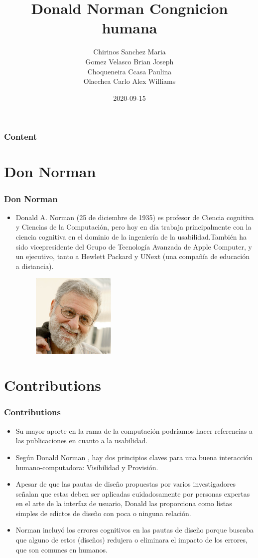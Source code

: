 \documentclass[11pt]{beamer}
\title[Donald Norman - Congnicion humana]{\bf\Huge Donald Norman    Congnicion humana }
\author[rescobedoq]
{
    Chirinos Sanchez Maria\inst{1}\\
	Gomez Velasco Brian Joseph \inst{2}\\
	Choqueneira Ccasa Paulina \inst{3}\\
	Olaechea Carlo Alex Williams\inst{4}
}
\institute[UNSA]
{
\inst{1}%
System Engineering School\\
}
\date[2020-09-15]{\scriptsize{2020-09-15}}
\begin{document}
\begin{frame}
\titlepage
\end{frame}

\begin{frame}
\frametitle{Content}
\tableofcontents
\end{frame}

\section{Don Norman}
\begin{frame}
\frametitle{Don Norman}
\begin{itemize}
 \item Donald A. Norman (25 de diciembre de 1935) es profesor  de Ciencia cognitiva y Ciencias de la Computación, pero hoy en día trabaja principalmente con la ciencia cognitiva en el dominio de la ingeniería de la usabilidad.También ha sido vicepresidente del Grupo de Tecnología Avanzada de Apple Computer, y un ejecutivo, tanto a Hewlett Packard y UNext (una compañía de educación a distancia).

\begin{figure}[t]
\includegraphics[width=4cm, height=4cm]{norman-don.jpg}
\centering
\end{figure}
\end{itemize}
\end{frame}

\section{Contributions}
\begin{frame}
\frametitle{Contributions}
\begin{itemize}
\item Su mayor aporte en la rama de la computación podríamos hacer referencias a las publicaciones en cuanto a la usabilidad. 
\item  Según Donald Norman , hay dos principios claves para una buena interacción humano-computadora: Visibilidad y Provisión.
\item Apesar de que las pautas de diseño propuestas por varios investigadores señalan que estas deben ser aplicadas cuidadosamente por personas expertas en el arte de la interfaz de usuario, Donald las proporciona como listas simples de edictos de diseño con poca o ninguna relación.
\item Norman incluyó los errores cognitivos en las pautas de diseño porque buscaba que alguno de estos (diseños) redujera o eliminara el impacto de los errores, que son comunes en humanos. 
\end{itemize}
\end{frame}
\end{document}
